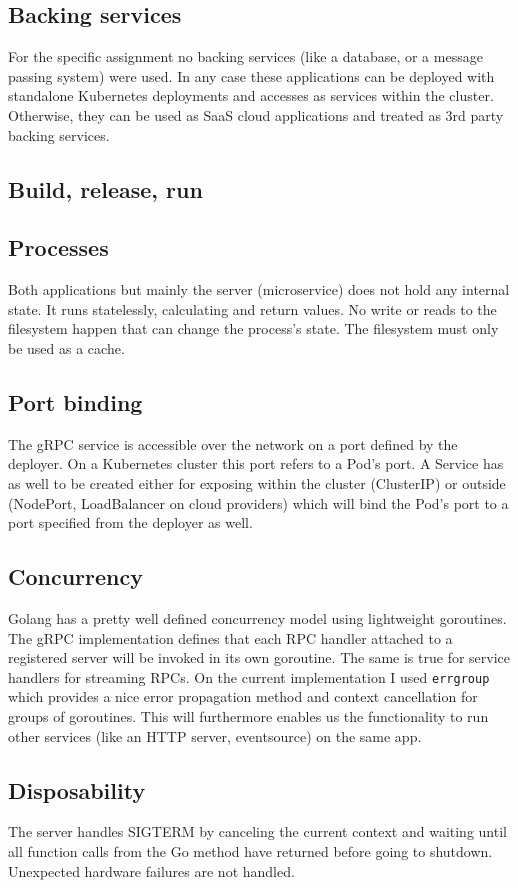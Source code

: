 \documentclass[a4paper,10pt]{article}
\begin{document}
\subsection{Backing services}
For the specific assignment no backing services (like a database, or a message passing system) were used. In any case these applications can be deployed with standalone Kubernetes deployments and accesses as services within the cluster. Otherwise, they can
be used as SaaS cloud applications and treated as 3rd party backing services.
\subsection{Build, release, run}

\subsection{Processes}
Both applications but mainly the server (microservice) does not hold any internal state. 
It runs statelessly, calculating and return values. No write or reads to the filesystem 
happen that can change the process's state. The filesystem must only be used as a cache.
\subsection{Port binding}
The gRPC service is accessible over the network on a port defined by the deployer. On a 
Kubernetes cluster this port refers to a Pod's port. A Service has as well to be created 
either for exposing within the cluster (ClusterIP) or outside (NodePort, LoadBalancer on 
cloud providers) which will bind the Pod's port to a port specified from the deployer as well.
\subsection{Concurrency}
Golang has a pretty well defined concurrency model using lightweight goroutines. The 
gRPC implementation defines that each RPC handler attached to a registered server will be invoked in its own goroutine. The same is true for service handlers for streaming RPCs. On 
the current implementation I used \texttt{errgroup} which provides a nice error propagation method and context cancellation for groups of goroutines. This will furthermore 
enables us the functionality to run other services (like an HTTP server, eventsource) on the same app.
\subsection{Disposability}
The server handles SIGTERM by canceling the current context and waiting until all function calls from the Go method have returned before going to shutdown. 
Unexpected hardware failures are not handled.
\end{document}
